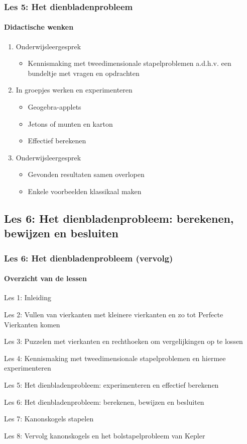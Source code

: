 \documentclass[dutch]{beamer}
\begin{document}
\begin{frame}
\frametitle{Les 5: Het dienbladenprobleem}
\framesubtitle{Didactische wenken}

\begin{enumerate}
	\item Onderwijsleergesprek
	\begin{itemize}
	\item Kennismaking met tweedimensionale stapelproblemen a.d.h.v. een bundeltje met vragen en opdrachten
\end{itemize}
	
	\item In groepjes werken en experimenteren 
	\begin{itemize}
	\item Geogebra-applets
	\item Jetons of munten en karton
	\item Effectief berekenen
\end{itemize}

  \item Onderwijsleergesprek
  \begin{itemize}
	\item Gevonden resultaten samen overlopen
	\item Enkele voorbeelden klassikaal maken
\end{itemize}
\end{enumerate}
\end{frame}




\subsection{Les 6: Het dienbladenprobleem: berekenen, bewijzen en besluiten}
\begin{frame}
\frametitle{Les 6: Het dienbladenprobleem {\small (vervolg)}}
\framesubtitle{Overzicht van de lessen}
\begin{list}{\quad}{}
\item Les 1: Inleiding
\item Les 2: Vullen van vierkanten met kleinere vierkanten en zo tot Perfecte Vierkanten komen
\item Les 3: Puzzelen met vierkanten en rechthoeken om vergelijkingen op te lossen
\item Les 4: Kennismaking met tweedimensionale stapelproblemen en hiermee experimenteren
\item Les 5: Het dienbladenprobleem: experimenteren en effectief berekenen
\item {\color{blue}Les 6: Het dienbladenprobleem: berekenen, bewijzen en besluiten}
\item Les 7: Kanonskogels stapelen
\item Les 8: Vervolg kanonskogels en het bolstapelprobleem van Kepler
\end{list}
\end{frame}
\end{document}
